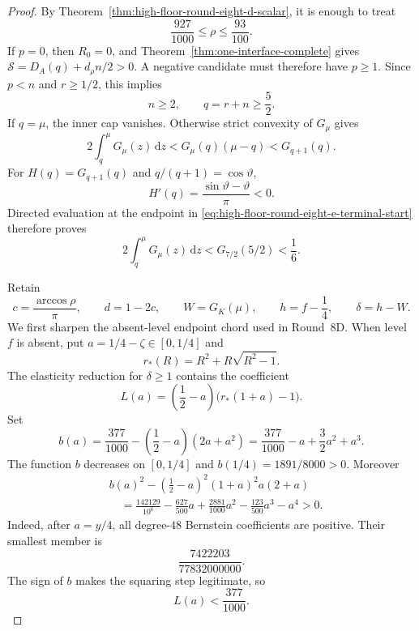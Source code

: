 \documentclass[11pt]{article}
\theoremstyle{remark}
\newcommand{\dd}{\,\mathrm d}
\begin{document}
\begin{proof}
By Theorem~\ref{thm:high-floor-round-eight-d-scalar}, it is enough to
treat
\[
 \frac{927}{1000}\leq\rho\leq\frac{93}{100}.
\]
If $p=0$, then $R_0=0$, and
Theorem~\ref{thm:one-interface-complete} gives
$\mathcal S=D_A(q)+d_\rho n/2>0$.  A negative candidate must therefore
have $p\geq1$.  Since $p<n$ and $r\geq1/2$, this implies
\begin{equation}
 n\geq2,\qquad q=r+n\geq\frac52.
 \label{eq:high-floor-round-eight-e-terminal-start}
\end{equation}
If $q=\mu$, the inner cap vanishes.  Otherwise strict convexity of
$G_\mu$ gives
\[
 2\int_q^\mu G_\mu(z)\dd z
 <G_\mu(q)(\mu-q)<G_{q+1}(q).
\]
For $H(q)=G_{q+1}(q)$ and $q/(q+1)=\cos\vartheta$,
\[
 H'(q)=\frac{\sin\vartheta-\vartheta}{\pi}<0.
\]
Directed evaluation at the endpoint in
\eqref{eq:high-floor-round-eight-e-terminal-start} therefore proves
\begin{equation}
 \boxed{
 2\int_q^\mu G_\mu(z)\dd z
 <G_{7/2}(5/2)<\frac16.}
 \label{eq:high-floor-round-eight-e-cap}
\end{equation}

Retain
\[
 c=\frac{\arccos\rho}{\pi},\qquad d=1-2c,\qquad
 W=G_K(\mu),\qquad h=f-\frac14,\qquad \delta=h-W.
\]
We first sharpen the absent-level endpoint chord used in Round~8D.
When level $f$ is absent, put
$a=1/4-\zeta\in[0,1/4]$ and
\[
 r_*(R)=R^2+R\sqrt{R^2-1}.
\]
The elasticity reduction for $\delta\geq1$ contains the coefficient
\[
 L(a)=\left(\frac12-a\right)\bigl(r_*(1+a)-1\bigr).
\]
Set
\[
 b(a)=\frac{377}{1000}
      -\left(\frac12-a\right)(2a+a^2)
 =\frac{377}{1000}-a+\frac32a^2+a^3.
\]
The function $b$ decreases on $[0,1/4]$ and
$b(1/4)=1891/8000>0$.  Moreover
\begin{equation}
\begin{aligned}
 &b(a)^2-\left(\frac12-a\right)^2(1+a)^2a(2+a)\\
 &\quad=
 \frac{142129}{10^6}-\frac{627}{500}a
 +\frac{2881}{1000}a^2-\frac{123}{500}a^3-a^4>0.
\end{aligned}
 \label{eq:high-floor-round-eight-e-absent-polynomial}
\end{equation}
Indeed, after $a=y/4$, all degree-$48$ Bernstein coefficients are
positive.  Their smallest member is
\[
 \frac{7422203}{77832000000}.
\]
The sign of $b$ makes the squaring step legitimate, so
\begin{equation}
 \boxed{L(a)<\frac{377}{1000}.}
 \label{eq:high-floor-round-eight-e-absent-chord}
\end{equation}


\end{proof}
\end{document}
